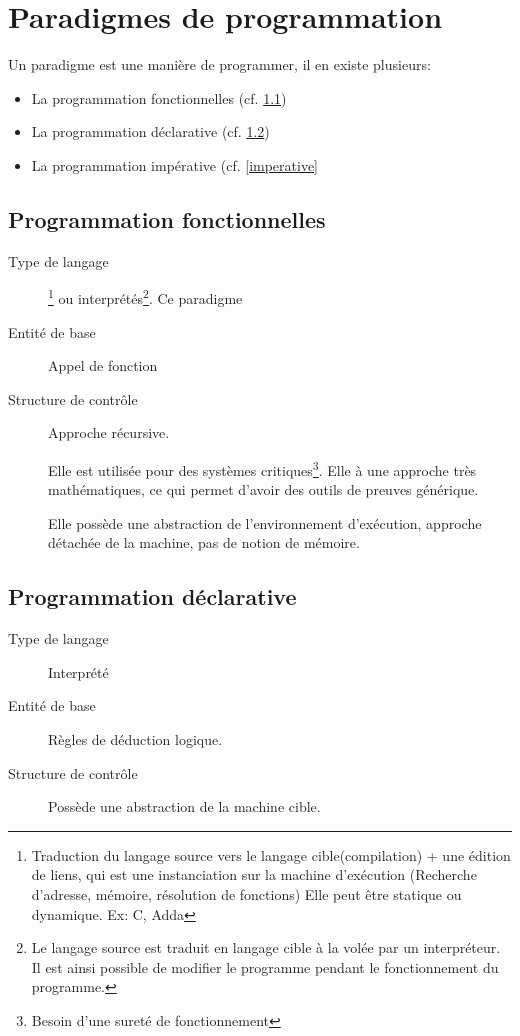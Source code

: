 	\chapter{Paradigmes de programmation}
		Un paradigme est une manière de programmer, il en existe plusieurs: 
		\begin{itemize}
			\item La programmation fonctionnelles (cf. \ref{fonctionnelles})
			\item La programmation déclarative (cf. \ref{declarative})
			\item La programmation impérative (cf. \ref{imperative}
		\end{itemize}
		\section{Programmation fonctionnelles} \label{fonctionnelles}
		\begin{description}
		\item[Type de langage] \footnote{Traduction du langage source vers le langage cible(compilation) + une édition de liens, qui est une instanciation sur la machine d'exécution (Recherche d'adresse, mémoire, résolution de fonctions) Elle peut être statique ou dynamique. Ex: C, Adda} ou interprétés\footnote{
		Le langage source est traduit en langage cible à la volée par un interpréteur. Il est ainsi possible de modifier le programme pendant le fonctionnement du programme.}. Ce paradigme
		\item[Entité de base] Appel de fonction
		\item[Structure de contrôle] Approche récursive. 


		Elle est utilisée pour des systèmes critiques\footnote{Besoin d'une sureté de fonctionnement}. Elle à une approche très mathématiques, ce qui 
		permet d'avoir des outils de preuves générique.

		Elle possède une abstraction de l'environnement d'exécution, approche détachée de la machine, pas de notion de mémoire.

	\end{description}
	\section{Programmation déclarative} \label{declarative}
		\begin{description}
			\item[Type de langage] Interprété
			\item[Entité de base] Règles de déduction logique.
			\item[Structure de contrôle  ]
			Possède une abstraction de la machine cible.
		\end{description}
		\newpage

